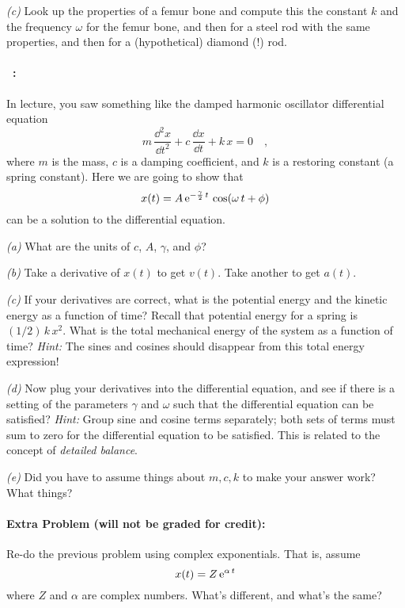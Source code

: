 \documentclass[12pt]{article}
\begin{document}
\textsl{(c)} Look up the properties of a femur bone and compute this
the constant $k$ and the frequency $\omega$ for the femur bone, and
then for a steel rod with the same properties, and then for a
(hypothetical) diamond (!) rod.

\paragraph{\problemname~\theproblem:}%
In lecture, you saw something like the damped harmonic oscillator
differential equation
\begin{equation}
m\,\frac{\dd^2 x}{\dd t^2} + c\,\frac{\dd x}{\dd t} + k\,x = 0 \quad ,
\end{equation}
where $m$ is the mass, $c$ is a damping coefficient, and $k$ is a
restoring constant (a spring constant).  Here we are going to show
that
\begin{equation}
x(t) = A\,\mathrm{e}^{-\frac{\gamma}{2}\,t}\,\cos (\omega\,t + \phi)
\end{equation}
can be a solution to the differential equation.

\textsl{(a)} What are the units of $c$, $A$, $\gamma$, and $\phi$?

\textsl{(b)} Take a derivative of $x(t)$ to get $v(t)$. Take another
to get $a(t)$.

\textsl{(c)} If your derivatives are correct, what is the potential
energy and the kinetic energy as a function of time? Recall that
potential energy for a spring is $(1/2)\,k\,x^2$. What is the total
mechanical energy of the system as a function of time? \emph{Hint:}
The sines and cosines should disappear from this total energy
expression!

\textsl{(d)} Now plug your derivatives into the differential equation,
and see if there is a setting of the parameters $\gamma$ and $\omega$
such that the differential equation can be satisfied? \emph{Hint:}
Group sine and cosine terms separately; both sets of terms must sum to
zero for the differential equation to be satisfied. This is related to
the concept of \emph{detailed balance}.

\textsl{(e)} Did you have to assume things about $m, c, k$ to make
your answer work? What things?

\paragraph{Extra Problem (will not be graded for credit):}%
Re-do the previous problem using complex exponentials. That is, assume
\begin{equation}
x(t) = Z\,\mathrm{e}^{\alpha\,t}
\end{equation}
where $Z$ and $\alpha$ are complex numbers. What's different, and
what's the same?
\end{document}
